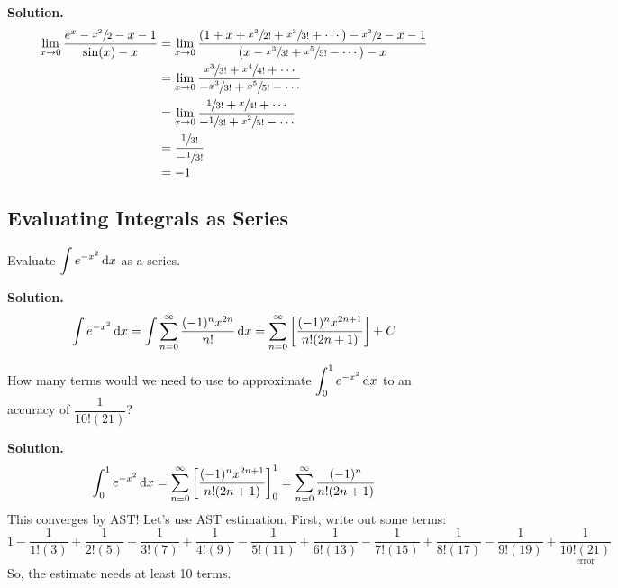 \begin{Example}{}{}
\begin{enumerate}[label=(\roman*)]
              \textbf{Solution.}
              \begin{align*}
                  \lim\limits_{{x} \to {0}} \frac{e^x-\sfrac{x^2}{2} -x-1}{\sin(x)-x}
                   & =\lim\limits_{{x} \to {0}}
                  \frac{\left( 1+x+\sfrac{x^2}{2!}+\sfrac{x^3}{3!}+\cdots \right)-
                  \sfrac{x^2}{2} -x-1}{\left( x-\sfrac{x^3}{3!} +\sfrac{x^5}{5!} -\cdots \right)-x}       \\
                   & =\lim\limits_{{x} \to {0}}
                  \frac{\sfrac{x^3}{3!} +\sfrac{x^4}{4!}+\cdots}{-\sfrac{x^3}{3!}+\sfrac{x^5}{5!}-\cdots} \\
                   & =\lim\limits_{{x} \to {0}}
                  \frac{\sfrac{1}{3!}+\sfrac{x}{4!}+\cdots}{-\sfrac{1}{3!}+\sfrac{x^2}{5!} -\cdots}       \\
                   & =\frac{\sfrac{1}{3!}  }{-\sfrac{1}{3!}  }                                            \\
                   & =-1
              \end{align*}
    \end{enumerate}
\end{Example}

\subsection*{Evaluating Integrals as Series}

\begin{Example}{}{}
    Evaluate $ \displaystyle \int e^{-x^2}\odif{x} $ as a series.

    \textbf{Solution.}
    \[ \int e^{-x^2}\odif{x}
        =\int \sum\limits_{n=0}^{\infty} \frac{(-1)^n x^{2n}}{n!} \odif{x}
        =\sum\limits_{n=0}^{\infty} \left[ \frac{(-1)^n x^{2n+1}}{n!(2n+1)} \right]+C \]
\end{Example}

\begin{Example}{}{}
    How many terms would we need to use to approximate
    $ \displaystyle \int_{0}^{1} e^{-x^2}\odif{x} $
    to an accuracy of $ \dfrac{1}{10!(21)} $?

    \textbf{Solution.}
    \[ \int_{0}^{1} e^{-x^2}\odif{x}
        = \sum\limits_{n=0}^{\infty}\left[ \frac{(-1)^n x^{2n+1}}{n!(2n+1)} \right]_0^1
        =\sum\limits_{n=0}^{\infty} \frac{(-1)^n}{n!(2n+1)}   \]
    This converges by AST\@! Let's use AST estimation. First, write out some terms:
    \[ 1-\frac{1}{1!(3)} +\frac{1}{2!(5)} -\frac{1}{3!(7)} +\frac{1}{4!(9)}-
        \frac{1}{5!(11)}+\frac{1}{6!(13)} -\frac{1}{7!(15)} +\frac{1}{8!(17)} -\frac{1}{9!(19)} +
        \underset{\text{error}}{\boxed{\frac{1}{10!(21)}}} \]
    So, the estimate needs at least 10 terms.
\end{Example}

